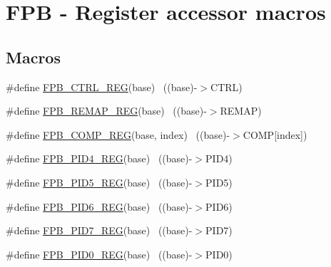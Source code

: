 \hypertarget{group___f_p_b___register___accessor___macros}{}\section{F\+PB -\/ Register accessor macros}
\label{group___f_p_b___register___accessor___macros}
\subsection*{Macros}
\begin{DoxyCompactItemize}
\item 
\#define \hyperlink{group___f_p_b___register___accessor___macros_ga51c51db7f0fa370f16b973df21399a88}{F\+P\+B\+\_\+\+C\+T\+R\+L\+\_\+\+R\+EG}(base)                                          ~((base)-\/$>$C\+T\+RL)
\item 
\#define \hyperlink{group___f_p_b___register___accessor___macros_gaa4d1a55b94416f3ef869793d4d461e5c}{F\+P\+B\+\_\+\+R\+E\+M\+A\+P\+\_\+\+R\+EG}(base)                                        ~((base)-\/$>$R\+E\+M\+AP)
\item 
\#define \hyperlink{group___f_p_b___register___accessor___macros_ga52fd8faa26cc52d39d15e4897e218bcb}{F\+P\+B\+\_\+\+C\+O\+M\+P\+\_\+\+R\+EG}(base,  index)                              ~((base)-\/$>$C\+O\+MP\mbox{[}index\mbox{]})
\item 
\#define \hyperlink{group___f_p_b___register___accessor___macros_gac4488406275c11c81ee5843d2686d198}{F\+P\+B\+\_\+\+P\+I\+D4\+\_\+\+R\+EG}(base)                                          ~((base)-\/$>$P\+I\+D4)
\item 
\#define \hyperlink{group___f_p_b___register___accessor___macros_ga7272b28f89b58ec02dab267cd22e503e}{F\+P\+B\+\_\+\+P\+I\+D5\+\_\+\+R\+EG}(base)                                          ~((base)-\/$>$P\+I\+D5)
\item 
\#define \hyperlink{group___f_p_b___register___accessor___macros_gaf5bfa0e3353fc7448eebb0069982ef26}{F\+P\+B\+\_\+\+P\+I\+D6\+\_\+\+R\+EG}(base)                                          ~((base)-\/$>$P\+I\+D6)
\item 
\#define \hyperlink{group___f_p_b___register___accessor___macros_gacd70110093ba38643ce4f76ca99d6c66}{F\+P\+B\+\_\+\+P\+I\+D7\+\_\+\+R\+EG}(base)                                          ~((base)-\/$>$P\+I\+D7)
\item 
\#define \hyperlink{group___f_p_b___register___accessor___macros_ga3f10cec0f0637403303c41c9088dc5bb}{F\+P\+B\+\_\+\+P\+I\+D0\+\_\+\+R\+EG}(base)                                          ~((base)-\/$>$P\+I\+D0)

\end{DoxyCompactItemize}
